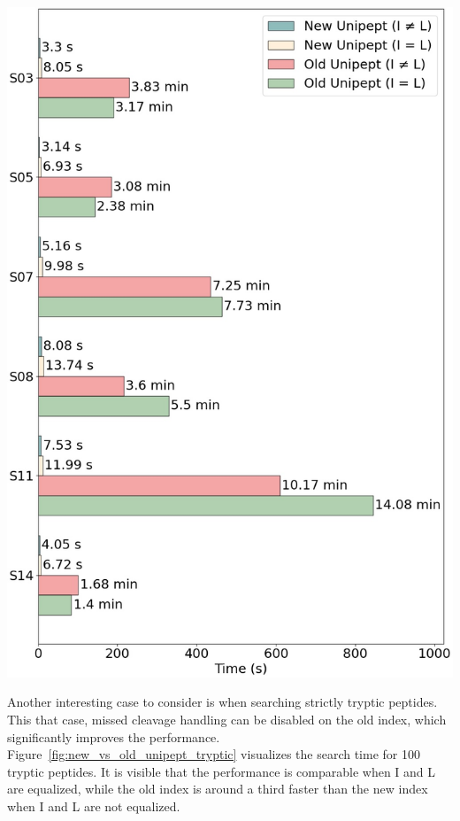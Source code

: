 \documentclass[11pt]{article}
\newenvironment{Figure}
{\par\medskip\noindent\minipage{\linewidth}}
{\endminipage\par\medskip}
\begin{document}
\begin{multicols}{2}
\begin{Figure}
{                \includegraphics{new_vs_old_unipept}
            }
            \label{fig:new_vs_old_unipept}
        \end{Figure}

        Another interesting case to consider is when searching strictly tryptic peptides.
        This that case, missed cleavage handling can be disabled on the old index, which significantly improves the performance.
        Figure~\ref{fig:new_vs_old_unipept_tryptic} visualizes the search time for 100 tryptic peptides.
        It is visible that the performance is comparable when I and L are equalized, while the old index is around a third faster than the new index when I and L are not equalized.


\end{multicols}
\end{document}
